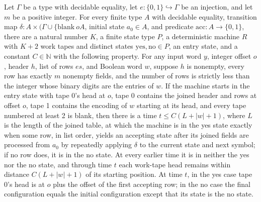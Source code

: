 \begin{theorem}
\label{Turing.exists_tableFindTM}
\leanok
{}
Let $\Gamma$ be a type with decidable equality, let $e:\{0,1\}\hookrightarrow\Gamma$ be
an injection, and let $m$ be a positive integer. For every finite type $A$ with
decidable equality, transition map $\delta:A\times(\Gamma\cup\{\text{blank}\	o A$,
initial state $a_0\in A$, and predicate $\mathrm{acc}:A\to\{0,1\}$, there are a natural
number $K$, a finite state type $P$, a deterministic machine $R$ with $K+2$ work tapes
and distinct states $\mathrm{yes},\mathrm{no}\in P$, an entry state, and a constant
$C\in\mathbb N$ with the following property. For any input word $y$, integer offset $o$,
header $h$, list of rows $es$, and Boolean word $w$, suppose $h$ is nonempty, every row
has exactly $m$ nonempty fields, and the number of rows is strictly less than the
integer whose binary digits are the entries of $w$. If the machine starts in the entry
state with tape 0's head at $o$, tape 0 contains the joined header and rows at offset
$o$, tape 1 contains the encoding of $w$ starting at its head, and every tape numbered
at least 2 is blank, then there is a time $t\le C(L+|w|+1)$, where $L$ is the length of
the joined table, at which the machine is in the yes state exactly when some row, in
list order, yields an accepting state after its joined fields are processed from $a_0$
by repeatedly applying $\delta$ to the current state and next symbol; if no row does, it
is in the no state. At every earlier time it is in neither the yes nor the no state, and
through time $t$ each work-tape head remains within distance $C(L+|w|+1)$ of its
starting position. At time $t$, in the yes case tape 0's head is at $o$ plus the offset
of the first accepting row; in the no case the final configuration equals the initial
configuration except that its state is the no state.
\end{theorem}

